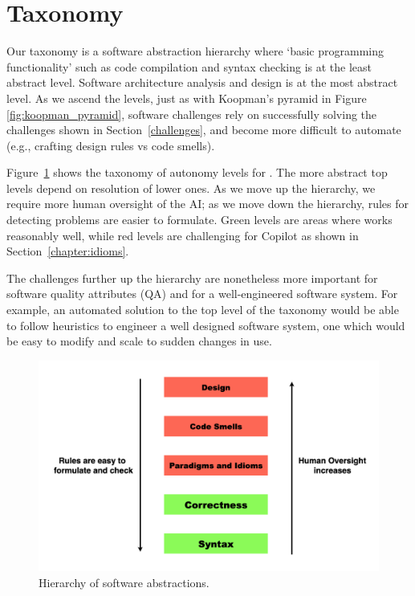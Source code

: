 \section{Taxonomy}
\label{taxonomy}
Our taxonomy is a software abstraction hierarchy where `basic programming functionality' such as code compilation and syntax checking is at the least abstract level.
Software architecture analysis and design is at the most abstract level.
As we ascend the levels, just as with Koopman's pyramid in Figure \ref{fig:koopman_pyramid}, software challenges rely on successfully solving the challenges shown in Section~\ref{challenges}, and become more difficult to automate (e.g., crafting design rules vs code smells). 

Figure~\ref{fig:taxonomy} shows the taxonomy of autonomy levels for \cct{}.  The more abstract top levels depend on resolution of lower ones. As we move up the hierarchy, we require more human oversight of the AI; as we move down the hierarchy, rules for detecting problems are easier to formulate. Green levels are areas where \AIDE{} works reasonably well, while red levels are challenging for Copilot as shown in Section~\ref{chapter:idioms}.

The challenges further up the hierarchy are nonetheless more important for software quality attributes (QA) \cite{Ernst2017} and for a well-engineered software system.
For example, an automated solution to the top level of the taxonomy would be able to follow heuristics to engineer a well designed software system, one which would be easy to modify and scale to sudden changes in use.

\begin{figure}[hbt!]
    \centering
    \includegraphics[width=\linewidth]{Figures/taxonomy.png}
    \caption{Hierarchy of software abstractions.}
    \label{fig:taxonomy}
\end{figure}
